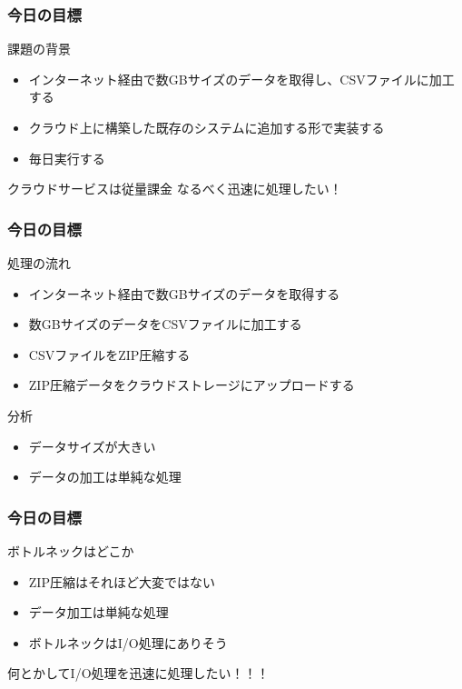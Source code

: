 \documentclass[aspectratio=169,dvipdfmx,14pt,notheorems]{beamer}
\theoremstyle{definition}
\begin{document}
\begin{frame}\frametitle{今日の目標}

\begin{block}{課題の背景}
\begin{itemize}
\item インターネット経由で数GBサイズのデータを取得し、CSVファイルに加工する
\item クラウド上に構築した既存のシステムに追加する形で実装する
\item 毎日実行する
\end{itemize}
\end{block}

\begin{alertblock}{クラウドサービスは従量課金}
なるべく迅速に処理したい！
\end{alertblock}
\end{frame}

\begin{frame}\frametitle{今日の目標}

\begin{block}{処理の流れ}
\begin{itemize}
\item インターネット経由で数GBサイズのデータを取得する
\item 数GBサイズのデータをCSVファイルに加工する
\item CSVファイルをZIP圧縮する
\item ZIP圧縮データをクラウドストレージにアップロードする
\end{itemize}
\end{block}

\begin{exampleblock}{分析}
\begin{itemize}
\item データサイズが大きい
\item データの加工は単純な処理
\end{itemize}
\end{exampleblock}
\end{frame}

\begin{frame}\frametitle{今日の目標}

\begin{block}{ボトルネックはどこか}
\begin{itemize}
\item ZIP圧縮はそれほど大変ではない
\item データ加工は単純な処理
\item ボトルネックはI/O処理にありそう
\end{itemize}
\end{block}
何とかしてI/O処理を迅速に処理したい！！！
\end{frame}
\end{document}
